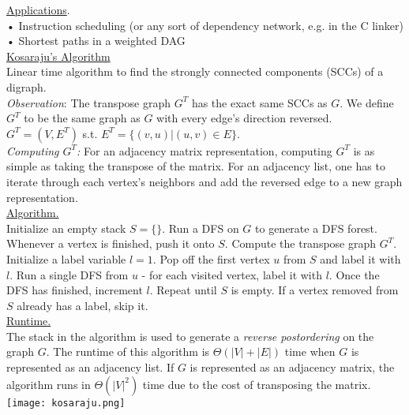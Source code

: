 \documentclass[12pt, fleqn]{general}
\begin{document}
\begin{multicols*}{2}
    \underline{Applications}.\\
    • Instruction scheduling (or any sort of dependency network, e.g. in the C linker)\\
    • Shortest paths in a weighted DAG\\

    {\large \underline{Kosaraju's Algorithm}}\\

    Linear time algorithm to find the strongly connected components (SCCs) of a digraph.\\

    \emph{Observation}: The transpose graph $G^T$ has the exact same SCCs as $G$. We define $G^T$ to be the same graph as $G$ with every edge's direction reversed. $G^T = (V, E^T)$ s.t. $E^T = \{(v,u) | (u,v) \in E\}$.\\

    \emph{Computing $G^T$:} For an adjacency matrix representation, computing $G^T$ is as simple as taking the transpose of the matrix. For an adjacency list, one has to iterate through each vertex's neighbors and add the reversed edge to a new graph representation.\\

    \underline{Algorithm.}\\

    Initialize an empty stack $S = \{\}$. Run a DFS on $G$ to generate a DFS forest. Whenever a vertex is finished, push it onto $S$. Compute the transpose graph $G^T$. Initialize a label variable $l = 1$. Pop off the first vertex $u$ from $S$ and label it with $l$. Run a single DFS from $u$ - for each visited vertex, label it with $l$. Once the DFS has finished, increment $l$. Repeat until $S$ is empty. If a vertex removed from $S$ already has a label, skip
    it.\\

    \underline{Runtime.}\\
    
    The stack in the algorithm is used to generate a \emph{reverse postordering} on the graph $G$. The runtime of this algorithm is $\Theta(|V|+|E|)$ time when $G$ is represented as an adjacency list. If $G$ is represented as an adjacency matrix, the algorithm runs in $\Theta(|V|^2)$ time due to the cost of transposing the matrix.\\

    \texttt{[image: kosaraju.png]}\\


\end{multicols*}
\end{document}
